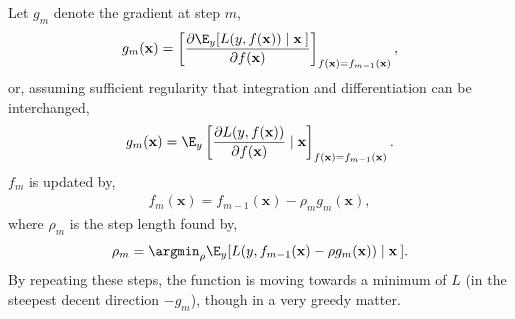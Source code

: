 Let $g_m$ denote the gradient at step $m$,
\begin{align}
  g_{m}(\mathbf{x}) = \left[ \frac{\partial \E_{y} [ L(y, f(\mathbf{x})) \mid \mathbf{x}\:]}{\partial f(\mathbf{x})}  \right]_{f(\mathbf{x}) = f_{m-1}(\mathbf{x})},
\end{align}
or, assuming sufficient regularity that integration and differentiation can be interchanged, 
\begin{align}
  g_{m}(\mathbf{x}) = \E_{y} \left[ \frac{\partial L(y, f(\mathbf{x})) }{\partial f(\mathbf{x})}  \mid \mathbf{x}\right]_{f(\mathbf{x}) = f_{m-1}(\mathbf{x})}.
\end{align}
$f_m$ is updated by,
\begin{align}
  f_m(\mathbf{x}) = f_{m-1}(\mathbf{x}) - \rho_m  g_m(\mathbf{x}),
\end{align}
where $\rho_m$ is the step length found by,
\begin{align}
  \rho_m = \argmin_{\rho}  \E_{y} [ L(y, f_{m-1}(\mathbf{x}) - \rho g_m(\mathbf{x}))  \mid \mathbf{x}\:].
\end{align}
By repeating these steps, the function is moving towards a minimum of $L$ (in the steepest decent direction $-g_m$), though in a very greedy matter. 

